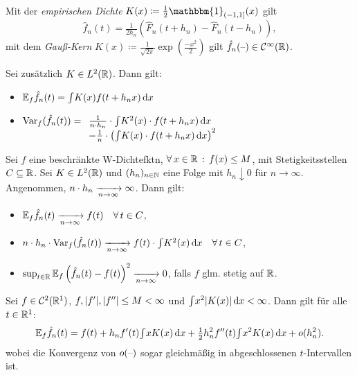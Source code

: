 \documentclass{cheat-sheet}
\newcommand{\E}{\mathbb{E}} %
\newcommand{\ind}{\mathbbm{1}} %
\newcommand{\Cont}{\mathcal{C}} %
\DeclareMathOperator{\var}{Var} %
\begin{document}

\begin{bspe}
  Mit der \emph{empirischen Dichte} $K(x) \coloneqq \tfrac{1}{2} \ind_{\ocinterval{-1}{1}}(x)$ gilt
  \[ \hat{f}_n(t) = \tfrac{1}{2 h_n} \left( \hat{F}_n(t + h_n) - \hat{F}_n(t - h_n) \right), \]
  mit dem \emph{Gauß-Kern} $K(x) \coloneqq \tfrac{1}{\sqrt{2 \pi}}\exp( \tfrac{- x^2}{2})$ gilt $\hat{f}_n(\blank) \in \Cont^\infty(\R)$.
\end{bspe}

\begin{lem}
  Sei zusätzlich $K \in L^2(\mathbb{R})$.
  Dann gilt:
  \begin{itemize}
    \item $\E_f \hat{f}_n(t) = \IInt{K(x) f(t + h_n x)}{x}$
    \item
    $\var_f (\hat{f}_n(t)) = 
    \begin{array}[t]{l}
      \tfrac{1}{n \cdot h_n} \cdot \IInt{K^2(x) \cdot f(t + h_n x)}{x} \\
      - \tfrac{1}{n} \cdot \left( \IInt{K(x) \cdot f(t + h_n x)}{x} \right)^2
    \end{array}$
  \end{itemize}
\end{lem}

\begin{satz}
  Sei $f$ eine beschränkte W-Dichtefktn, $\forall \, {x \in \mathbb{R}} \,:\, f(x) \leq M$, mit Stetigkeitsstellen $C \subseteq \mathbb{R}$.
  Sei $K \in L^2(\mathbb{R})$ und $(h_n)_{n \in \mathbb{N}}$ eine Folge mit $h_n \downarrow 0$ für $n \to \infty$.
  Angenommen, $n \cdot h_n \xrightarrow[n \to \infty]{} \infty$.
  Dann gilt:
  \begin{itemize}
    \item $\E_f \hat{f}_n(t) \xra[n \to \infty]{} f(t) \quad \forall \, t \in C$,
    \item $n \cdot h_n \cdot \var_f (\hat{f}_n(t)) \xra[n \to \infty]{} f(t) \cdot \IInt{K^2(x)}{x} \quad \forall \, t \in C$,
    \item $\sup_{t \in \R} \E_f \left( \hat{f}_n(t) - f(t) \right)^2 \xra[n \to \infty]{} 0$, falls $f$ glm. stetig auf $\mathbb{R}$.
  \end{itemize}
\end{satz}

\begin{satz}
  Sei $f \in \Cont^2(\R^1)$, $f, \lvert f'\rvert, \lvert f''\rvert \leq M < \infty$ und ${\textstyle \int} x^2 \lvert K(x)\rvert \,\mathrm{d} x < \infty$.
  Dann gilt für alle $t \in \mathbb{R}^1$:
  \[
    \E_f \hat{f}_n(t) = f(t) + h_n f'(t) \IInt{x K(x)}{x} + \tfrac{1}{2} h_n^2 f''(t) \IInt{x^2 K(x)}{x} + o(h_n^2).
  \]
  wobei die Konvergenz von $o(\text{--})$ sogar gleichmäßig in abgeschlossenen $t$-Intervallen ist.
\end{satz}
\end{document}
